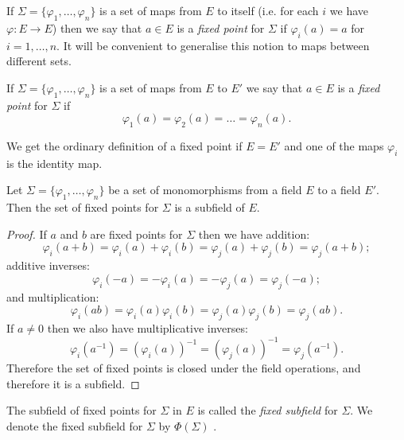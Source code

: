If $\Sigma = \{\varphi_1, \dots, \varphi_n\}$ is a set of maps from $E$ to itself (i.e. for each $i$ we have $\varphi : E \to E$) then we say that $a \in E$ is a \emph{fixed point} for $\Sigma$ if $\varphi_i(a) = a$ for $i = 1, \dots, n$. It will be convenient to generalise this notion to maps between different sets.

\begin{definition}
	If $\Sigma = \{\varphi_1, \dots, \varphi_n\}$ is a set of maps from $E$ to $E'$ we say that $a \in E$ is a \emph{fixed point} for $\Sigma$ if
	\[
		\varphi_1(a) = \varphi_2(a) = \dots = \varphi_n(a).
	\]
\end{definition}

\begin{note}
	We get the ordinary definition of a fixed point if $E = E'$ and one of the maps $\varphi_i$ is the identity map.
\end{note}

\begin{lemma}
	Let $\Sigma = \{\varphi_1, \dots, \varphi_n\}$ be a set of monomorphisms from a field $E$ to a field $E'$. Then the set of fixed points for $\Sigma$ is a subfield of $E$.
	\begin{proof}
		If $a$ and $b$ are fixed points for $\Sigma$ then we have addition:
		\[
			\varphi_i(a + b) = \varphi_i(a) + \varphi_i(b) = \varphi_j(a) + \varphi_j(b) = \varphi_j(a + b);
		\]
		additive inverses:
		\[
			\varphi_i(-a) = -\varphi_i(a) = -\varphi_j(a) = \varphi_j(-a);
		\]
		and multiplication:
		\[
			\varphi_i(ab) = \varphi_i(a) \varphi_i(b) = \varphi_j(a) \varphi_j(b) = \varphi_j(ab).
		\]
		If $a \neq 0$ then we also have multiplicative inverses:
		\[
			\varphi_i(a^{-1}) = (\varphi_i(a))^{-1} = (\varphi_j(a))^{-1} = \varphi_j(a^{-1}).
		\]
		Therefore the set of fixed points is closed under the field operations, and therefore it is a subfield.
	\end{proof}
\end{lemma}

The subfield of fixed points for $\Sigma$ in $E$ is called the \emph{fixed subfield} for $\Sigma$. We denote the fixed subfield for $\Sigma$ by $\Phi(\Sigma)$ .


